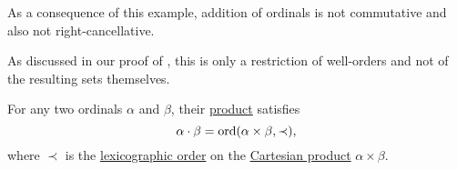 \begin{example}
  As a consequence of this example, addition of ordinals is not commutative and also not right-cancellative.

  As discussed in our proof of , this is only a restriction of well-orders and not of the resulting sets themselves.
\end{example}

\begin{proposition}\label{thm:ordinal_multiplication_cartesian_product}
  For any two ordinals \( \alpha \) and \( \beta \), their \hyperref[def:ordinal_arithmetic/multiplication]{product} satisfies
  \begin{equation*}
    \alpha \cdot \beta = \operatorname{ord}(\alpha \times \beta, \prec),
  \end{equation*}
  where \( \prec \) is the \hyperref[def:lexicographic_order]{lexicographic order} on the \hyperref[def:cartesian_product]{Cartesian product} \( \alpha \times \beta \).
\end{proposition}
